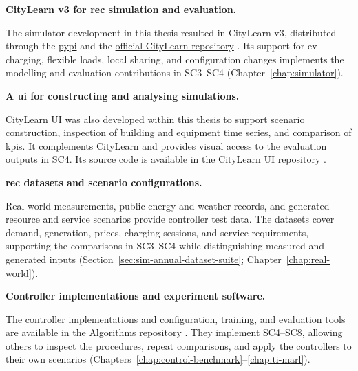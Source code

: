\begin{description}[leftmargin=3.6em,labelwidth=3em,labelsep=0.6em,align=left,font=\normalfont\bfseries,itemsep=0.35\baselineskip,parsep=0pt,topsep=0.5\baselineskip]
\item[OSSC1] \textbf{CityLearn v3 for \gls{rec} simulation and evaluation.}\par\nobreak
The simulator development in this thesis resulted in CityLearn v3, distributed through the \href{https://pypi.org/project/citylearn/}{\gls*{pypi}} and the \href{https://github.com/citylearn-project/CityLearn}{official CityLearn repository} \parencite{citylearn2026pypi,citylearn2026official}. Its support for \gls{ev} charging, flexible loads, local sharing, and configuration changes implements the modelling and evaluation contributions in SC3--SC4 (Chapter~\ref{chap:simulator}).

\item[OSSC2] \textbf{A \gls{ui} for constructing and analysing simulations.}\par\nobreak
CityLearn UI was also developed within this thesis to support scenario construction, inspection of building and equipment time series, and comparison of \glspl{kpi}. It complements CityLearn and provides visual access to the evaluation outputs in SC4. Its source code is available in the \href{https://github.com/Soft-CPS-Research-Group/citylearn-ui}{CityLearn UI repository} \parencite{softcps2026citylearnui}.

\item[OSSC3] \textbf{\gls{rec} datasets and scenario configurations.}\par\nobreak
Real-world measurements, public energy and weather records, and generated resource and service scenarios provide controller test data. The datasets cover demand, generation, prices, charging sessions, and service requirements, supporting the comparisons in SC3--SC4 while distinguishing measured and generated inputs (Section~\ref{sec:sim-annual-dataset-suite}; Chapter~\ref{chap:real-world}).

\item[OSSC4] \textbf{Controller implementations and experiment software.}\par\nobreak
The controller implementations and configuration, training, and evaluation tools are available in the \href{https://github.com/Soft-CPS-Research-Group/Algorithms}{Algorithms repository} \parencite{softcps2026algorithms}. They implement SC4--SC8, allowing others to inspect the procedures, repeat comparisons, and apply the controllers to their own scenarios (Chapters~\ref{chap:control-benchmark}--\ref{chap:ti-marl}).


\end{description}
